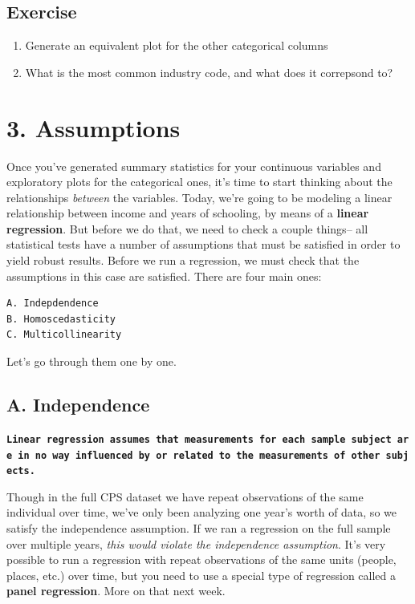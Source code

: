 \documentclass[
  letterpaper,
  DIV=11,
  numbers=noendperiod]{scrreprt}
\providecommand{\tightlist}{%
  \setlength{\itemsep}{0pt}\setlength{\parskip}{0pt}}\usepackage{longtable,booktabs,array}
\begin{document}
\hypertarget{exercise-25}{%
\subsection{Exercise}\label{exercise-25}}

\begin{enumerate}
\def\labelenumi{\arabic{enumi}.}
\tightlist
\item
  Generate an equivalent plot for the other categorical columns
\item
  What is the most common industry code, and what does it correpsond to?
\end{enumerate}

\hypertarget{assumptions}{%
\section{3. Assumptions}\label{assumptions}}

Once you've generated summary statistics for your continuous variables
and exploratory plots for the categorical ones, it's time to start
thinking about the relationships \emph{between} the variables. Today,
we're going to be modeling a linear relationship between income and
years of schooling, by means of a \textbf{linear regression}. But before
we do that, we need to check a couple things-- all statistical tests
have a number of assumptions that must be satisfied in order to yield
robust results. Before we run a regression, we must check that the
assumptions in this case are satisfied. There are four main ones:

\begin{verbatim}
A. Indepdendence 
B. Homoscedasticity
C. Multicollinearity 
\end{verbatim}

Let's go through them one by one.

\hypertarget{a.-independence}{%
\subsection{A. Independence}\label{a.-independence}}

\textbf{\texttt{Linear\ regression\ assumes\ that\ measurements\ for\ each\ sample\ subject\ are\ in\ no\ way\ influenced\ by\ or\ related\ to\ the\ measurements\ of\ other\ subjects.}}

Though in the full CPS dataset we have repeat observations of the same
individual over time, we've only been analyzing one year's worth of
data, so we satisfy the independence assumption. If we ran a regression
on the full sample over multiple years, \emph{this would violate the
independence assumption}. It's very possible to run a regression with
repeat observations of the same units (people, places, etc.) over time,
but you need to use a special type of regression called a \textbf{panel
regression}. More on that next week.
\end{document}
